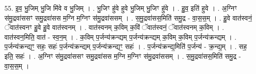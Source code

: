 \documentclass[17pt]{extarticle}
\begin{document}
55. इ॒व॒ भु॒जिम् भु॒जि मि॑वे व भु॒जिम् । . भु॒जिꣳ हु॑वे हुवे भु॒जिम् भु॒जिꣳ हु॑वे । . हु॒व॒ इति॑ हुवे । . अ॒ग्निꣳ स॑मु॒द्रवा॑ससꣳ समु॒द्रवा॑सस म॒ग्नि म॒ग्निꣳ स॑मु॒द्रवा॑ससम् । . स॒मु॒द्रवा॑सस॒मिति॑ समु॒द्र - वा॒स॒स॒म् । . हु॒वे वात॑स्वनं॒ ॅवात॑स्वनꣳ हु॒वे हु॒वे वात॑स्वनम् । . वात॑स्वनम् क॒विम् क॒विं ॅवात॑स्वनं॒ ॅवात॑स्वनम् क॒विम् । . वात॑स्वन॒मिति॒ वात॑ - स्व॒न॒म् । . क॒विम् प॒र्जन्य॑क्रन्द्यम् प॒र्जन्य॑क्रन्द्यम् क॒विम् क॒विम् प॒र्जन्य॑क्रन्द्यम् । . प॒र्जन्य॑क्रन्द्यꣳ॒॒ सहः॒ सहः॑ प॒र्जन्य॑क्रन्द्यम् प॒र्जन्य॑क्रन्द्यꣳ॒॒ सहः॑ । . प॒र्जन्य॑क्रन्द्य॒मिति॑ प॒र्जन्य॑ - क्र॒न्द्य॒म् । . सह॒ इति॒ सहः॑ । . अ॒ग्निꣳ स॑मु॒द्रवा॑ससꣳ समु॒द्रवा॑सस म॒ग्नि म॒ग्निꣳ स॑मु॒द्रवा॑ससम् । . स॒मु॒द्रवा॑सस॒मिति॑ समु॒द्र - वा॒स॒स॒म् । \newline
\pagebreak
\end{document}
